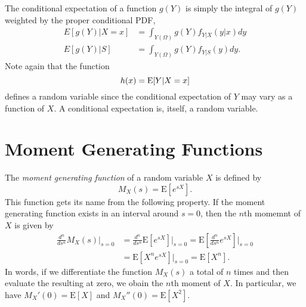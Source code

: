 The conditional expectation of a function $g(Y)$ is simply the integral of $g(Y)$ weighted by the proper conditional PDF,
\begin{align*}
E[g(Y) | X = x] &= \int_{Y(\Omega)} g(Y) f_{Y|X} (y|x) dy \\
E[g(Y) | S] &= \int_{Y(\Omega)} g(Y) f_{Y|S} (y) dy .
\end{align*}
Note again that the function
\begin{equation*}
h(x) = \mathrm{E} [Y | X=x]
\end{equation*}
defines a random variable since the conditional expectation of $Y$ may vary as a function of $X$.
A conditional expectation is, itself, a random variable.


\section{Moment Generating Functions}

The \emph{moment generating function} of a random variable $X$ is defined by
\begin{equation*}
M_X (s) = \mathrm{E} \left[ e^{s X} \right] .
\end{equation*}
This function gets its name from the following property.
If the moment generating function exists in an interval around $s = 0$, then the $n$th momemnt of $X$ is given by
\begin{equation*}
\begin{split}
\frac{d^n}{ds^n} M_X (s) \Big|_{s=0}
&= \frac{d^n}{ds^n} \mathrm{E} \left[ e^{s X} \right] \Big|_{s=0}
= \mathrm{E} \left[ \frac{d^n}{ds^n} e^{s X} \right] \bigg|_{s=0} \\
&= \mathrm{E} \left[ X^n e^{s X} \right] \Big|_{s=0}
= \mathrm{E} [X^n] .
\end{split}
\end{equation*}
In words, if we differentiate the function $M_X(s)$ a total of $n$ times and then evaluate the resulting at zero, we obain the $n$th moment of $X$.
In particular, we have $M_X'(0) = \mathrm{E} [X]$ and $M_X''(0) = \mathrm{E} [X^2]$.

